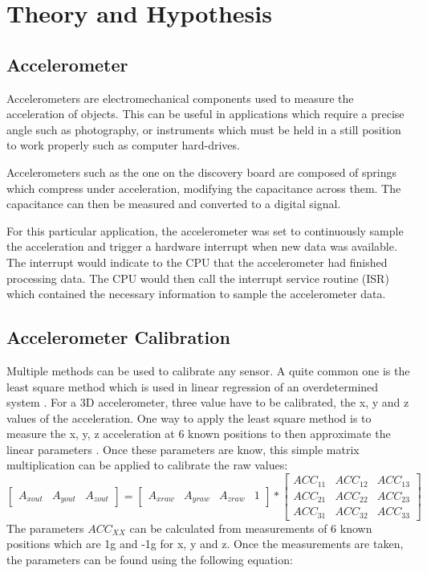 \documentclass[12pt]{article}
\begin{document}
\section{Theory and Hypothesis}
\subsection{Accelerometer}
Accelerometers are electromechanical components used to measure the acceleration of objects. This can be useful in applications which require a precise angle such as photography, or instruments which must be held in a still position to work properly such as computer hard-drives.

Accelerometers such as the one on the discovery board are composed of springs which compress under acceleration, modifying the capacitance across them. The capacitance can then be measured and converted to a digital signal.

For this particular application, the accelerometer was set to continuously sample the acceleration and trigger a hardware interrupt when new data was available. The interrupt would indicate to the CPU that the accelerometer had finished processing data. The CPU would then call the interrupt service routine (ISR) which contained the necessary information to sample the accelerometer data.

\subsection{Accelerometer Calibration}

Multiple methods can be used to calibrate any sensor. A quite common one is the least square method which is used in linear regression of an overdetermined system \cite{bjorck1996numerical}. For a 3D accelerometer, three value have to be calibrated, the x, y and z values of the acceleration. One way to apply the least square method is to measure the x, y, z acceleration at 6 known positions to then approximate the linear parameters \cite{AN3182ApplicationNote}. Once these parameters are know, this simple matrix multiplication can be applied to calibrate the raw values:
\begin{equation} \label{cal_eq:1}
 \begin{bmatrix}A_{xout} & A_{yout} & A_{zout}\end{bmatrix} = \begin{bmatrix}A_{xraw} & A_{yraw} & A_{zraw} & 1\end{bmatrix} *
\begin{bmatrix}ACC_{11} & ACC_{12} & ACC_{13} \\
ACC_{21} & ACC_{22} & ACC_{23} \\
ACC_{31} & ACC_{32} & ACC_{33} \end{bmatrix}
\end{equation}
The parameters $ ACC_{XX} $ can be calculated from measurements of 6 known positions which are 1g and -1g for x, y and z. Once the measurements are taken, the parameters can be found using the following equation:
\end{document}
